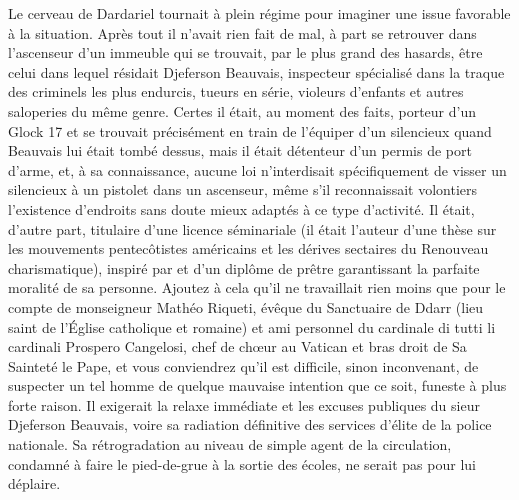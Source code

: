 \illusloflabel{}%
Le cerveau de Dardariel tournait à plein régime pour imaginer une issue favorable à la situation. Après tout il n’avait rien fait de mal, à part se retrouver dans l’ascenseur d’un immeuble qui se trouvait, par le plus grand des hasards, être celui dans lequel résidait Djeferson Beauvais, inspecteur spécialisé dans la traque des criminels les plus endurcis, tueurs en série, violeurs d’enfants et autres saloperies du même genre. Certes il était, au moment des faits, porteur d’un Glock 17 et se trouvait précisément en train de l’équiper d’un silencieux quand Beauvais lui était tombé dessus, mais il était détenteur d’un permis de port d’arme, et, à sa connaissance, aucune loi n’interdisait spécifiquement de visser un silencieux à un pistolet dans un ascenseur, même s’il reconnaissait volontiers l’existence d’endroits sans doute mieux adaptés à ce type d’activité. Il était, d’autre part, titulaire d’une licence séminariale (il était l’auteur d’une thèse sur les mouvements %
pentecôtistes américains et les dérives sectaires du Renouveau charismatique), inspiré par et d’un diplôme de prêtre garantissant la parfaite moralité de sa personne. Ajoutez à cela qu’il ne travaillait rien moins que pour le compte de monseigneur Mathéo Riqueti, évêque du Sanctuaire de Ddarr (lieu saint de l’Église catholique et romaine) et ami personnel du \foreignlanguage{italian}{cardinale di tutti li cardinali} Prospero Cangelosi, chef de chœur au Vatican et bras droit de Sa Sainteté le Pape, et vous conviendrez qu’il est difficile, sinon inconvenant, de suspecter un tel homme de quelque mauvaise intention que ce soit, funeste à plus forte raison. Il exigerait la relaxe immédiate et les excuses publiques du sieur Djeferson Beauvais, voire sa radiation définitive des services d’élite de la police nationale. Sa rétrogradation au niveau de simple agent de la circulation, condamné à faire le pied-de-grue à la sortie des écoles, ne serait pas pour lui déplaire.


